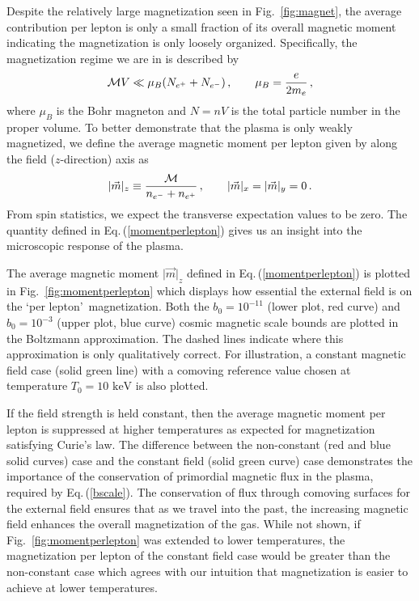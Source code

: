 \documentclass[reprint]{revtex4-2}
\newcommand*{\keV}{\text{ keV}}
\newcommand{\req}[1]{Eq.\,(\ref{#1})}
\newcommand{\rf}[1]{Fig.~{\ref{#1}}}
\begin{document}
Despite the relatively large magnetization seen in \rf{fig:magnet}, the average contribution per lepton is only a small fraction of its overall magnetic moment indicating the magnetization is only loosely organized. Specifically, the magnetization regime we are in is described by
\begin{align}
    \label{fractionalmagnetization}
    {\cal M}V\ll\mu_{B}(N_{e^{+}}+N_{e^{-}})\,,\qquad\mu_{B}=\frac{e}{2m_{e}}\,,
\end{align}
where $\mu_{B}$ is the Bohr magneton and $N=nV$ is the total particle number in the proper volume. To better demonstrate that the plasma is only weakly magnetized, we define the average magnetic moment per lepton given by along the field ($z$-direction) axis as
\begin{align}
    \label{momentperlepton}
    \vert\vec{m}\vert_{z}\equiv\frac{{\cal M}}{n_{e^{-}}+n_{e^{+}}}\,,\qquad\vert\vec{m}\vert_{x}=\vert\vec{m}\vert_{y}=0\,.
\end{align}
From spin statistics, we expect the transverse expectation values to be zero. The quantity defined in \req{momentperlepton} gives us an insight into the microscopic response of the plasma.

The average magnetic moment $\vert\vec{m}\vert_{z}$ defined in \req{momentperlepton} is plotted in \rf{fig:momentperlepton} which displays how essential the external field is on the \lq per lepton\rq\ magnetization. Both the $b_{0}=10^{-11}$ (lower plot, red curve) and $b_{0}=10^{-3}$ (upper plot, blue curve) cosmic magnetic scale bounds are plotted in the Boltzmann approximation. The dashed lines indicate where this approximation is only qualitatively correct. For illustration, a constant magnetic field case (solid green line) with a comoving reference value chosen at temperature $T_{0}=10\keV$ is also plotted.

If the field strength is held constant, then the average magnetic moment per lepton is suppressed at higher temperatures as expected for magnetization satisfying Curie's law. The difference between the non-constant (red and blue solid curves) case and the constant field (solid green curve) case demonstrates the importance of the conservation of primordial magnetic flux in the plasma, required by \req{bscale}. The conservation of flux through comoving surfaces for the external field ensures that as we travel into the past, the increasing magnetic field enhances the overall magnetization of the gas. While not shown, if \rf{fig:momentperlepton} was extended to lower temperatures, the magnetization per lepton of the constant field case would be greater than the non-constant case which agrees with our intuition that magnetization is easier to achieve at lower temperatures.
\end{document}
